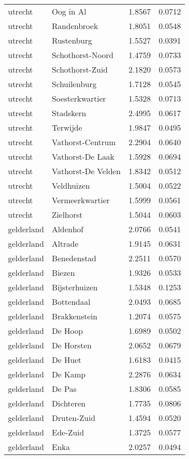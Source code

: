 \begin{longtable}{llcc}
utrecht & Oog in Al & 1.8567 & 0.0712 \\
utrecht & Randenbroek & 1.8051 & 0.0548 \\
utrecht & Rustenburg & 1.5527 & 0.0391 \\
utrecht & Schothorst-Noord & 1.4759 & 0.0733 \\
utrecht & Schothorst-Zuid & 2.1820 & 0.0573 \\
utrecht & Schuilenburg & 1.7128 & 0.0545 \\
utrecht & Soesterkwartier & 1.5328 & 0.0713 \\
utrecht & Stadskern & 2.4995 & 0.0617 \\
utrecht & Terwijde & 1.9847 & 0.0495 \\
utrecht & Vathorst-Centrum & 2.2904 & 0.0640 \\
utrecht & Vathorst-De Laak & 1.5928 & 0.0694 \\
utrecht & Vathorst-De Velden & 1.8342 & 0.0512 \\
utrecht & Veldhuizen & 1.5004 & 0.0522 \\
utrecht & Vermeerkwartier & 1.5999 & 0.0561 \\
utrecht & Zielhorst & 1.5044 & 0.0603 \\
gelderland & Aldenhof & 2.0766 & 0.0541 \\
gelderland & Altrade & 1.9145 & 0.0631 \\
gelderland & Benedenstad & 2.2511 & 0.0570 \\
gelderland & Biezen & 1.9326 & 0.0533 \\
gelderland & Bijsterhuizen & 1.5348 & 0.1253 \\
gelderland & Bottendaal & 2.0493 & 0.0685 \\
gelderland & Brakkenstein & 1.2074 & 0.0575 \\
gelderland & De Hoop & 1.6989 & 0.0502 \\
gelderland & De Horsten & 2.0652 & 0.0679 \\
gelderland & De Huet & 1.6183 & 0.0415 \\
gelderland & De Kamp & 2.2876 & 0.0634 \\
gelderland & De Pas & 1.8306 & 0.0585 \\
gelderland & Dichteren & 1.7735 & 0.0806 \\
gelderland & Druten-Zuid & 1.4594 & 0.0520 \\
gelderland & Ede-Zuid & 1.3725 & 0.0577 \\
gelderland & Enka & 2.0257 & 0.0494 \\

\end{longtable}
